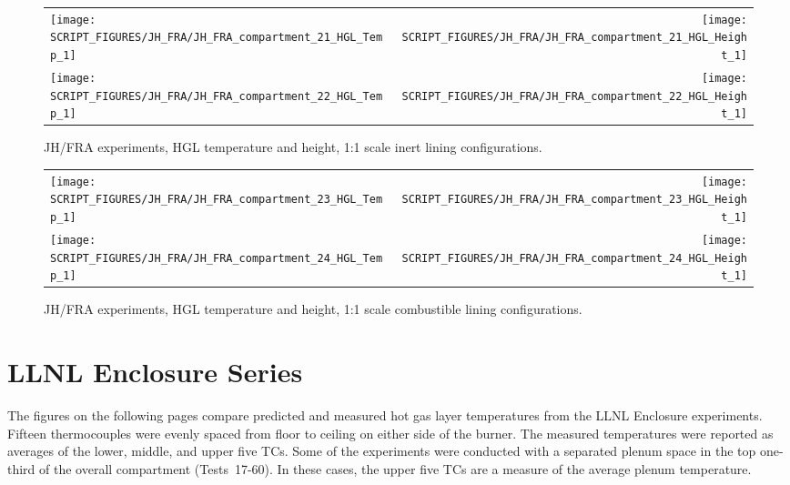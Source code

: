 \newpage

\begin{figure}[!h]
\begin{tabular*}{\textwidth}{l@{\extracolsep{\fill}}r}
\texttt{[image: SCRIPT\_FIGURES/JH\_FRA/JH\_FRA\_compartment\_21\_HGL\_Temp\_1]} &
\texttt{[image: SCRIPT\_FIGURES/JH\_FRA/JH\_FRA\_compartment\_21\_HGL\_Height\_1]} \\
\texttt{[image: SCRIPT\_FIGURES/JH\_FRA/JH\_FRA\_compartment\_22\_HGL\_Temp\_1]} &
\texttt{[image: SCRIPT\_FIGURES/JH\_FRA/JH\_FRA\_compartment\_22\_HGL\_Height\_1]} \\
\end{tabular*}
\caption[JH/FRA experiments, HGL temperature and height, 1:1 scale inert lining configurations]
{JH/FRA experiments, HGL temperature and height, 1:1 scale inert lining configurations.}
\label{JH_FRA_HGL_5}
\end{figure}

\newpage

\begin{figure}[!h]
\begin{tabular*}{\textwidth}{l@{\extracolsep{\fill}}r}
\texttt{[image: SCRIPT\_FIGURES/JH\_FRA/JH\_FRA\_compartment\_23\_HGL\_Temp\_1]} &
\texttt{[image: SCRIPT\_FIGURES/JH\_FRA/JH\_FRA\_compartment\_23\_HGL\_Height\_1]} \\
\texttt{[image: SCRIPT\_FIGURES/JH\_FRA/JH\_FRA\_compartment\_24\_HGL\_Temp\_1]} &
\texttt{[image: SCRIPT\_FIGURES/JH\_FRA/JH\_FRA\_compartment\_24\_HGL\_Height\_1]} \\
\end{tabular*}
\caption[JH/FRA experiments, HGL temperature and height, 1:1 scale combustible lining configurations]
{JH/FRA experiments, HGL temperature and height, 1:1 scale combustible lining configurations.}
\label{JH_FRA_HGL_6}
\end{figure}

\newpage



\section{LLNL Enclosure Series}

The figures on the following pages compare predicted and measured hot gas layer temperatures from the LLNL Enclosure experiments. Fifteen thermocouples were evenly spaced from floor to ceiling on either side of the burner. The measured temperatures were reported as averages of the lower, middle, and upper five TCs. Some of the experiments were conducted with a separated plenum space in the top one-third of the overall compartment (Tests~17-60). In these cases, the upper five TCs are a measure of the average plenum temperature.

